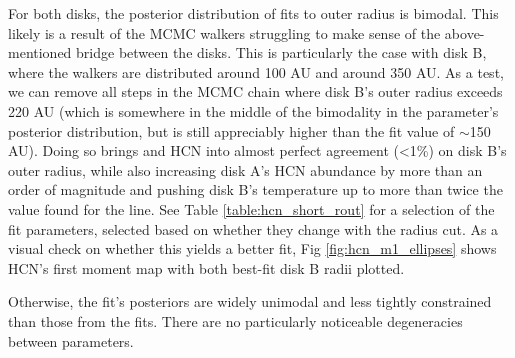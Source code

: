For both disks, the posterior distribution of fits to outer radius is bimodal. This likely is a result of the MCMC walkers struggling to make sense of the above-mentioned bridge between the disks. This is particularly the case with disk B, where the walkers are distributed around 100 AU and around 350 AU. As a test, we can remove all steps in the MCMC chain where disk B's outer radius exceeds 220 AU (which is somewhere in the middle of the bimodality in the parameter's posterior distribution, but is still appreciably higher than the \hco fit value of $\sim$150 AU). Doing so brings \hco and HCN into almost perfect agreement (\textless 1\%) on disk B's outer radius, while also increasing disk A's HCN abundance by more than an order of magnitude and pushing disk B's temperature up to more than twice the value found for the \hco line. See Table \ref{table:hcn_short_rout} for a selection of the fit parameters, selected based on whether they change with the radius cut. As a visual check on whether this yields a better fit, Fig \ref{fig:hcn_m1_ellipses} shows HCN's first moment map with both best-fit disk B radii plotted.

Otherwise, the fit's posteriors are widely unimodal and less tightly constrained than those from the \hco fits. There are no particularly noticeable degeneracies between parameters.




